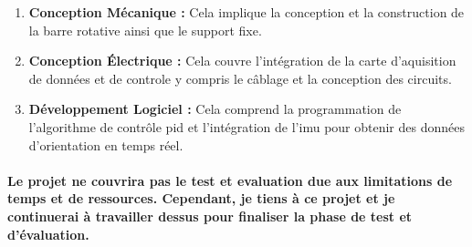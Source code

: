 \begin{enumerate}
	\item \textbf{Conception Mécanique :} Cela implique la conception et la construction de la barre rotative ainsi que le support fixe.
	\item \textbf{Conception Électrique :}  Cela couvre l'intégration de la carte d'aquisition de données et de controle y compris le câblage et la conception des circuits.
	\item \textbf{Développement Logiciel :} Cela comprend la programmation de l'algorithme de contrôle \acrshort{pid} et l'intégration de l'\gls{imu} pour obtenir des données d'orientation en temps réel.
\end{enumerate}

\paragraph{Le projet ne couvrira pas le test et evaluation due aux limitations de temps et de ressources. Cependant, je tiens à ce projet et je continuerai à travailler dessus pour finaliser la phase de test et d'évaluation.}
